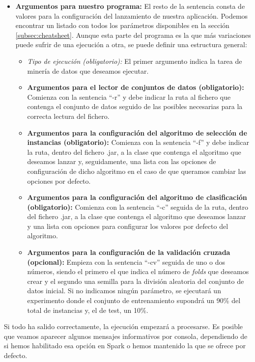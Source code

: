 \begin{itemize}
\item \textbf{Argumentos para nuestro programa:} El resto de la sentencia consta de valores para la configuración del lanzamiento de nuestra aplicación. Podemos encontrar un listado con todos los parámetros disponibles en la sección \ref{subsec:cheatsheet}. Aunque esta parte del programa es la que más variaciones puede sufrir de una ejecución a otra, se puede definir una estructura general:
	\begin{itemize}
		\item \emph{Tipo de ejecución (obligatorio):} El primer argumento indica la tarea de minería de datos que deseamos ejecutar.
		\item \textbf{Argumentos para el lector de conjuntos de datos (obligatorio):} Comienza con la sentencia ``-r'' y debe indicar la ruta al fichero que contenga el conjunto de datos seguido de las posibles necesarias para la correcta lectura del fichero.
		\item \textbf{Argumentos para la configuración del algoritmo de selección de instancias (obligatorio):} Comienza con la sentencia ``-f'' y debe indicar la ruta, dentro del fichero .jar, a la clase que contenga el algoritmo que deseamos lanzar y, seguidamente, una lista con las opciones de configuración de dicho algoritmo en el caso de que queramos cambiar las opciones por defecto.
		\item \textbf{Argumentos para la configuración del algoritmo de clasificación (obligatorio):}  Comienza con la sentencia ``-c'' seguida de la ruta, dentro del fichero .jar, a la clase que contenga el algoritmo que deseamos lanzar y una lista con opciones para configurar los valores por defecto del algoritmo.
		\item \textbf{Argumentos para la configuración de la validación cruzada (opcional):} Empieza con la sentencia ``-cv'' seguida de uno o dos números, siendo el primero el que indica el número de \textit{folds} que deseamos crear y el segundo una semilla para la división aleatoria del conjunto de datos inicial. Si no indicamos ningún parámetro, se ejecutará un experimento donde el conjunto de entrenamiento supondrá un 90\% del total de instancias y, el de test, un 10\%.
	\end{itemize}
\end{itemize}

Si todo ha salido correctamente, la ejecución empezará a procesarse. Es posible que veamos aparecer algunos mensajes informativos por consola, dependiendo de si hemos habilitado esa opción en Spark o hemos mantenido la que se ofrece por defecto.

